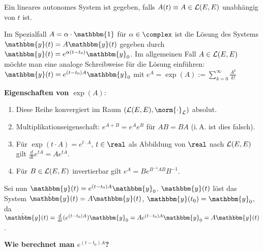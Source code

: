 Ein lineares autonomes System ist gegeben, falls $A(t) \equiv A \in \mathcal{L}(E, E)$
unabhängig von $t$ ist.

Im Spezialfall $A = \alpha \cdot \mathbbm{1}$ für $\alpha \in \complex$ ist
die Lösung des Systems $\dot{\mathbbm{y}}(t) = A \mathbbm{y}(t)$ gegeben durch
$\mathbbm{y}(t) = e^{\alpha (t - t_0)} \mathbbm{y}_0$.
Im allgemeinen Fall $A \in \mathcal{L}(E, E)$ möchte man eine analoge Schreibweise
für die Lösung einführen:
$\mathbbm{y}(t) = e^{(t - t_0) A} \mathbbm{y}_0$ mit
$e^A = \exp(A) := \sum_{k=0}^\infty \frac{A^k}{k!}$

\textbf{Eigenschaften von $\exp(A)$}:
\begin{enumerate}
    \item
    Diese Reihe konvergiert im Raum $(\L(E, E), \norm{\cdot}_\L)$ absolut.
    
    \item
    Multiplikationseigenschaft:
    $e^{A + B} = e^A e^B$ für $AB = BA$ (i.\,A. ist dies falsch).
    
    \item
    Für $\exp(t \cdot A) = e^{t \cdot A}$, $t \in \real$ als
    Abbildung von $\real$ nach $\mathcal{L}(E, E)$ gilt
    $\frac{d}{dt} e^{tA} = A e^{tA}$.
    
    \item
    Für $B \in \mathcal{L}(E, E)$ invertierbar gilt
    $e^A = B e^{B^{-1}AB} B^{-1}$.
\end{enumerate}

Sei nun $\mathbbm{y}(t) = e^{(t - t_0) A} \mathbbm{y}_0$.
$\mathbbm{y}(t)$ löst das System $\dot{\mathbbm{y}}(t) = A \mathbbm{y}(t)$,
$\mathbbm{y}(t_0) = \mathbbm{y}_0$, da \\
$\dot{\mathbbm{y}}(t) = \frac{d}{dt} (e^{(t - t_0) A}) \mathbbm{y}_0 =
A e^{(t - t_0) A} \mathbbm{y}_0 = A \mathbbm{y}(t)$.

\linie

\textbf{Wie berechnet man $e^{(t - t_0) A}$?}

